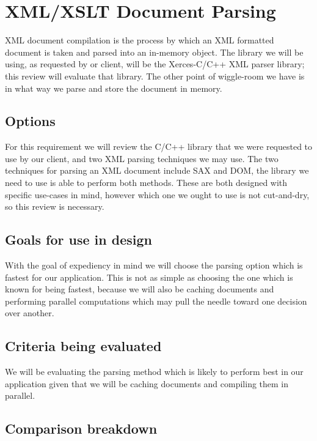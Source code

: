 \section{XML/XSLT Document Parsing}

XML document compilation is the process by which an XML formatted document is taken and parsed into an in-memory object.
The library we will be using, as requested by or client, will be the Xerces-C/C++ XML parser library; this review will evaluate that library.
The other point of wiggle-room we have is in what way we parse and store the document in memory.

\subsection{Options}

For this requirement we will review the C/C++ library that we were requested to use by our client, and two XML parsing techniques we may use.
The two techniques for parsing an XML document include SAX and DOM, the library we need to use is able to perform both methods.
These are both designed with specific use-cases in mind, however which one we ought to use is not cut-and-dry, so this review is necessary.

\subsection{Goals for use in design}

With the goal of expediency in mind we will choose the parsing option which is fastest for our application.
This is not as simple as choosing the one which is known for being fastest, because we will also be caching documents and performing parallel computations which may pull the needle toward one decision over another.

\subsection{Criteria being evaluated}

We will be evaluating the parsing method which is likely to perform best in our application given that we will be caching documents and compiling them in parallel.

\subsection{Comparison breakdown}


